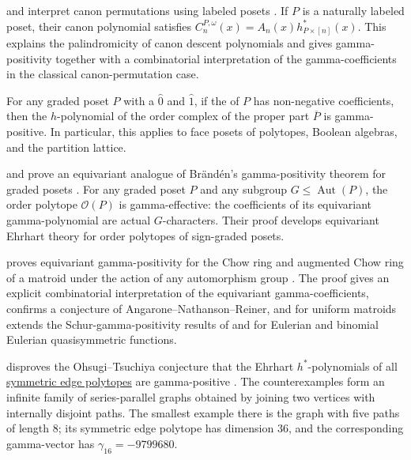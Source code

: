 and  interpret canon
permutations using labeled posets \cite{BeckDeligeorgaki2024x}.  If $P$ is a
naturally labeled poset, their canon polynomial satisfies
$C_n^{P,\omega}(x)=A_n(x)h^*_{P\times[n]}(x)$.  This explains the
palindromicity of canon descent polynomials and gives gamma-positivity
together with a combinatorial interpretation of the gamma-coefficients in the
classical canon-permutation case.


\begin{theorem}
For any graded poset $P$ with a $\hat{0}$ and $\hat{1}$,
if the \label{cdIndex} of $P$ has non-negative coefficients,
then the $h$-polynomial of the order complex of the proper part $\overline{P}$
is gamma-positive.
In particular, this applies to face posets of polytopes, Boolean algebras,
and the partition lattice.
\end{theorem}

 and 
prove an equivariant analogue of Brändén's gamma-positivity theorem for
graded posets \cite{DAliHigashitani2025x}.  For any graded poset $P$ and any
subgroup $G\leq \operatorname{Aut}(P)$, the order polytope $\mathcal{O}(P)$ is
gamma-effective: the coefficients of its equivariant gamma-polynomial are
actual $G$-characters.  Their proof develops equivariant Ehrhart theory for
order polytopes of sign-graded posets.

 proves equivariant gamma-positivity for the Chow ring
and augmented Chow ring of a matroid under the action of any automorphism
group \cite{Liao2024x}.  The proof gives an explicit combinatorial
interpretation of the equivariant gamma-coefficients, confirms a conjecture
of Angarone--Nathanson--Reiner, and for uniform matroids extends the
Schur-gamma-positivity results of  and
 for Eulerian and binomial Eulerian quasisymmetric
functions.

 disproves the Ohsugi--Tsuchiya conjecture that
the Ehrhart $h^*$-polynomials of all
\hyperref[symmetricEdgePolytope]{symmetric edge polytopes} are gamma-positive
\cite{Ferroni2026x}.  The counterexamples form an infinite family of
series-parallel graphs obtained by joining two vertices with internally
disjoint paths.  The smallest example there is the graph
with five paths of length $8$; its symmetric edge polytope has dimension $36$,
and the corresponding gamma-vector has $\gamma_{16}=-9799680$.


